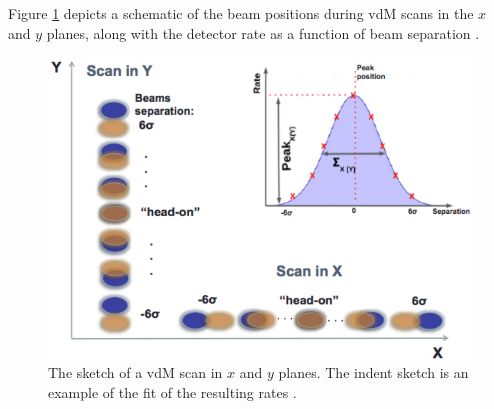 Figure \ref{vdm_sketch} depicts a schematic of the beam positions during vdM scans in the $x$ and $y$ planes, along with the detector rate as a function of beam separation  \cite{pas_18}.
\newpage
\begin{center}
  \begin{figure}[ht]
    \centering
    \includegraphics[scale=.50]{Chapter3/vdm_sketch.png}
    \caption[Sketch of a vdM scan in x and y planes and example of fitting resulting rates]{ The sketch of a vdM scan in $x$ and $y$ planes. The indent sketch is an example of the fit of the resulting rates \cite{vdM_sketch}.}
    \label{vdm_sketch}
  \end{figure}
\end{center}

